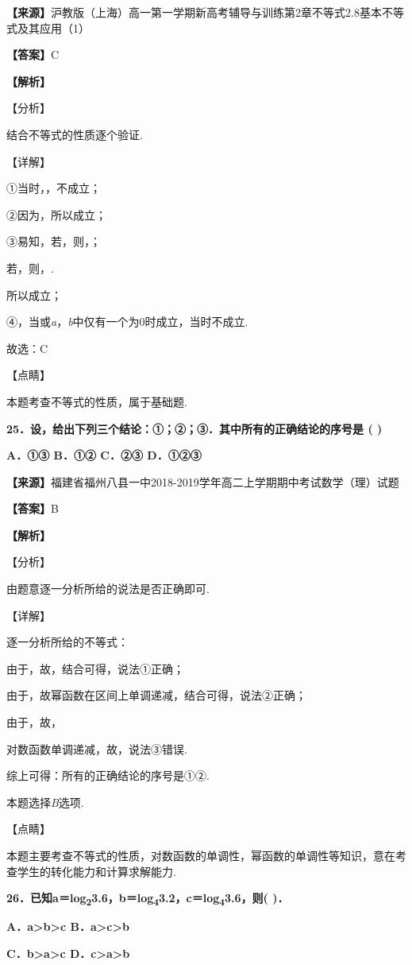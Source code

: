 \textbf{【来源】}沪教版（上海）高一第一学期新高考辅导与训练第2章不等式2.8基本不等式及其应用（1）

\textbf{【答案】}C

\textbf{【解析】}

【分析】

结合不等式的性质逐个验证.

【详解】

①当时，，不成立；

②因为，所以成立；

③易知，若，则，；

若，则，.

所以成立；

④，当或\emph{a}，\emph{b}中仅有一个为0时成立，当时不成立.

故选：C

【点睛】

本题考查不等式的性质，属于基础题.

\textbf{25．设，给出下列三个结论：①；②；③．其中所有的正确结论的序号是 (
)}

\textbf{A．①③ B．①② C．②③ D．①②③}

\textbf{【来源】}福建省福州八县一中2018-2019学年高二上学期期中考试数学（理）试题

\textbf{【答案】}B

\textbf{【解析】}

【分析】

由题意逐一分析所给的说法是否正确即可.

【详解】

逐一分析所给的不等式：

由于，故，结合可得，说法①正确；

由于，故幂函数在区间上单调递减，结合可得，说法②正确；

由于，故，

对数函数单调递减，故，说法③错误.

综上可得：所有的正确结论的序号是①②.

本题选择\emph{B}选项.

【点睛】

本题主要考查不等式的性质，对数函数的单调性，幂函数的单调性等知识，意在考查学生的转化能力和计算求解能力.

\textbf{26．已知a＝log\textsubscript{2}3.6，b＝log\textsubscript{4}3.2，c＝log\textsubscript{4}3.6，则(
)．}

\textbf{A．a\textgreater b\textgreater c
B．a\textgreater c\textgreater b}

\textbf{C．b\textgreater a\textgreater c
D．c\textgreater a\textgreater b}

